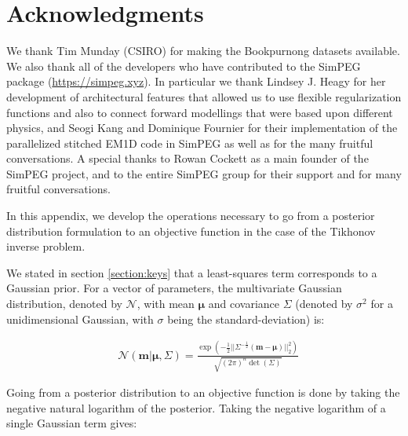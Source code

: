 \documentclass[extra]{gji} %
\begin{document}
\section{Acknowledgments}

We thank Tim Munday (CSIRO) for making the Bookpurnong datasets available. We also thank all of the developers who have contributed to the SimPEG package (\url{https://simpeg.xyz}). In particular we thank Lindsey J. Heagy for her development of architectural features that allowed us to use flexible regularization functions and also to connect forward modellings that were based upon different physics, and Seogi Kang and Dominique Fournier for their implementation of the parallelized stitched EM1D code in SimPEG as well as for the many fruitful conversations. A special thanks to Rowan Cockett as a main founder of the SimPEG project, and to the entire SimPEG group for their support and for many fruitful conversations.







 \label{appendix:PDtoL2}

In this appendix, we develop the operations necessary to go from a posterior distribution formulation to an objective function in the case of the Tikhonov inverse problem.

We stated in section \ref{section:keys} that a least-squares term corresponds to a Gaussian prior. For a vector of parameters, the multivariate Gaussian distribution, denoted by $\mathcal{N}$, with mean $\mathbf{\mu}$ and covariance $\Sigma$ (denoted by $\sigma^2$ for a unidimensional Gaussian, with $\sigma$ being the standard-deviation) is:

\begin{align}
&\mathcal{N}(\mathbf{m}|\mathbf{\mu}, \Sigma) = {\frac{\exp(-\frac{1}{2}||\Sigma^{-\frac{1}{2}}(\mathbf{m}-\mathbf{\mu})||_2^2)}{\sqrt{(2\pi)^n\det(\Sigma)}}} \label{GaussianDef_2}
\end{align}

Going from a posterior distribution to an objective function is done by taking the negative natural logarithm of the posterior. Taking the negative logarithm of a single Gaussian term gives:
\end{document}
